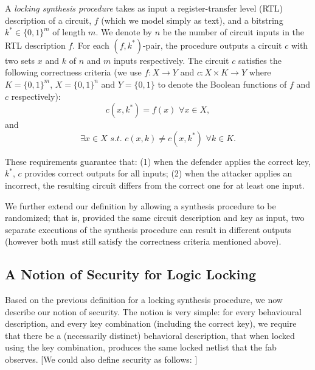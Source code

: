 \begin{definition}
A \emph{locking synthesis procedure} takes as input a register-transfer level (RTL) description of a circuit, $f$ (which we model simply as text), and a bitstring $k^{*} \in \{0,1\}^{m}$ of length $m$. We denote by $n$ be the number of circuit inputs in the RTL description $f$. For each $(f,k^*)$-pair, the procedure outputs a circuit $c$ with two sets $x$ and $k$ of $n$ and $m$ inputs respectively. The circuit $c$  satisfies the following correctness criteria (we use $f: X \rightarrow Y$ and $c: X \times K \rightarrow Y$ where $K = \{0,1\}^{m}$, $X = \{0,1\}^{n}$ and $Y = \{0,1\}$ to denote the Boolean functions of $f$ and $c$ respectively):
$$ c(x,k^{*}) = f(x) \, \, \forall x \in X, $$
and 
$$ \exists  x \in X \,\, s.t. \,\, c(x,k) \neq c(x,k^{*}) \, \, \forall k \in K.$$ 
\end{definition}



These requirements guarantee that: (1) when the defender applies the correct key, $k^{*}$,
$c$ provides correct outputs for all inputs; (2) when the attacker applies an incorrect, the resulting circuit differs from the correct one for at least one input.

We further extend our definition by allowing a synthesis procedure to be randomized; that is, provided the same circuit description and key as input, two separate executions of the synthesis procedure can result in different outputs (however both must still satisfy the correctness criteria mentioned above).

\subsection{A Notion of Security for Logic Locking}
 Based on the previous definition for a locking synthesis procedure, we now describe our notion of security. The notion is very simple: for every behavioural description, and every key combination (including the correct key), we require that there be a (necessarily distinct) behavioral description, that when locked using the key combination, produces the same locked netlist that the fab observes. [We could also define security as follows: ]
 
